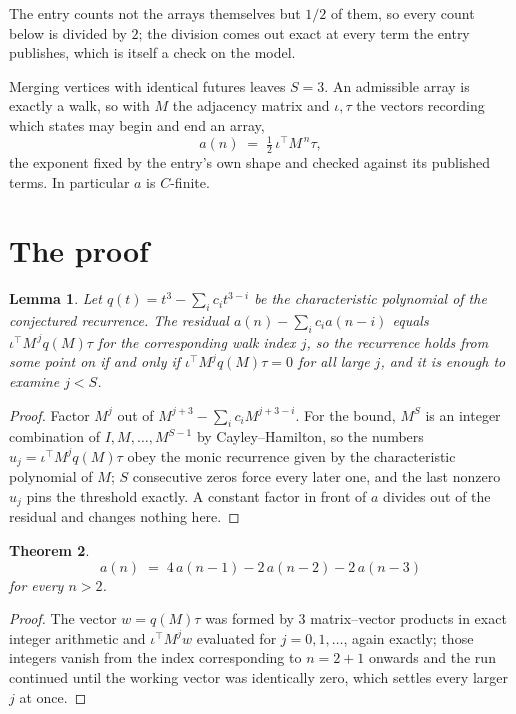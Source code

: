 \documentclass[11pt,a4paper]{article}
\theoremstyle{plain}
\newtheorem{theorem}{Theorem}
\newtheorem{lemma}[theorem]{Lemma}
\theoremstyle{definition}
\begin{document}
The entry counts not the arrays themselves but $1/2$ of them, so every count below is divided by $2$; the division comes out exact at every term the entry publishes, which is itself a check on the model.

Merging vertices with identical futures leaves $S=3$. An admissible array is exactly a walk, so with $M$ the adjacency matrix and $\iota,\tau$ the vectors recording which states may begin and end an array,
\[
a(n)\;=\;\tfrac{1}{2}\,\iota^{\!\top}M^{\,n}\tau ,
\]
the exponent fixed by the entry's own shape and checked against its published terms. In
particular $a$ is $C$-finite.

\section{The proof}

\begin{lemma}\label{lem:crit}
Let $q(t)=t^{3}-\sum_i c_it^{3-i}$ be the characteristic polynomial of the
conjectured recurrence. The residual $a(n)-\sum_ic_ia(n-i)$ equals
$\iota^{\!\top}M^{\,j}q(M)\tau$ for the corresponding walk index $j$, so the recurrence
holds from some point on if and only if $\iota^{\!\top}M^{j}q(M)\tau=0$ for all large $j$,
and it is enough to examine $j<S$.
\end{lemma}

\begin{proof}
Factor $M^{j}$ out of $M^{j+3}-\sum_ic_iM^{j+3-i}$. For the bound, $M^{S}$
is an integer combination of $I,M,\dots,M^{S-1}$ by Cayley--Hamilton, so the numbers
$u_j=\iota^{\!\top}M^{j}q(M)\tau$ obey the monic recurrence given by the characteristic
polynomial of $M$; $S$ consecutive zeros force every later one, and the last nonzero $u_j$
pins the threshold exactly. A constant factor in front of $a$ divides out of the residual and
changes nothing here.
\end{proof}

\begin{theorem}
\[
a(n)\;=\;4\,a(n-1) - 2\,a(n-2) - 2\,a(n-3)
\]
for every $n>2$.
\end{theorem}

\begin{proof}
The vector $w=q(M)\tau$ was formed by $3$ matrix--vector products in exact integer
arithmetic and $\iota^{\!\top}M^{j}w$ evaluated for $j=0,1,\dots$, again exactly; those
integers vanish from the index corresponding to $n=2+1$ onwards and the run continued
until the working vector was identically zero, which settles every larger $j$ at once.
\end{proof}
\end{document}
